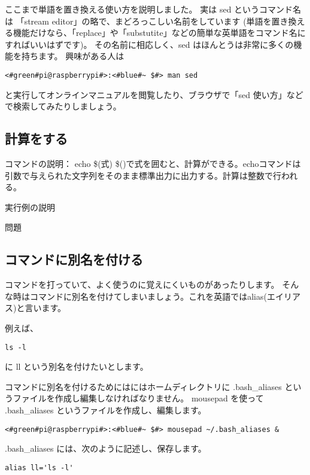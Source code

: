 ここまで単語を置き換える使い方を説明しました。
実は sed というコマンド名は 「stream editor」の略で、まどろっこしい名前をしています
(単語を置き換える機能だけなら、「replace」や「substutite」などの簡単な英単語をコマンド名にすればいいはずです)。
その名前に相応しく、sed はほんとうは非常に多くの機能を持ちます。
興味がある人は

\begin{lstlisting}
<#green#pi@raspberrypi#>:<#blue#~ $#> man sed
\end{lstlisting}

と実行してオンラインマニュアルを閲覧したり、ブラウザで「sed 使い方」などで検索してみたりしましょう。

\subsection{計算をする}

コマンドの説明： echo \$(式)
\$()で式を囲むと、計算ができる。echoコマンドは引数で与えられた文字列をそのまま標準出力に出力する。計算は整数で行われる。


実行例の説明

問題

\subsection{コマンドに別名を付ける}

コマンドを打っていて、よく使うのに覚えにくいものがあったりします。
そんな時はコマンドに別名を付けてしまいましょう。これを英語ではalias(エイリアス)と言います。

例えば、

\begin{lstlisting}[caption=lsコマンド, label=lsAlias]
    ls -l
\end{lstlisting}

に ll という別名を付けたいとします。

コマンドに別名を付けるためにはにはホームディレクトリに .bash{\_}aliases というファイルを作成し編集しなければなりません。
mousepad を使って .bash{\_}aliases というファイルを作成し、編集します。
\begin{lstlisting}[caption=.bashaliasesを開く, label=openBashAliases]
    <#green#pi@raspberrypi#>:<#blue#~ $#> mousepad ~/.bash_aliases &
\end{lstlisting}

.bash{\_}aliases には、次のように記述し、保存します。
\begin{lstlisting}[caption=.bashaliasesの中身, label=bashAliasesContents]
    alias ll='ls -l'
\end{lstlisting}

